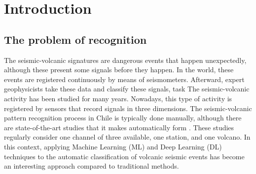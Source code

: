 \documentclass[journal]{IEEEtran}
\begin{document}
\section{Introduction}
% 
% 
% 
% 

\subsection{The problem of recognition}
The seismic-volcanic signatures are dangerous events that happen unexpectedly, although these present some signals before they happen. In the world, these events are registered continuously by means of seismometers. Afterward, expert geophysicists take these data and classify these signals, task 
The seismic-volcanic activity has been studied for many years. Nowadays, this type of activity is registered by sensors that record signals in three dimensions. The seismic-volcanic pattern recognition process in Chile is typically done manually, although there are state-of-the-art studies that it makes automatically form \cite{salazar2022multi,salazar2020deep,malfante2018automatic,bicego2012classification,curilem2016pattern, lara2020automatic}. These studies regularly consider one channel of three available, one station, and one volcano.
In this context, applying Machine Learning (ML) and Deep Learning (DL) techniques to the automatic classification of volcanic seismic events has become an interesting approach compared to traditional methods.
\end{document}
